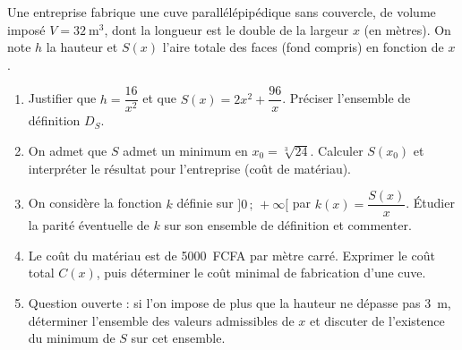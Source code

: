 \documentclass[11pt]{article}
\begin{document}
\begin{exercice}
Une entreprise fabrique une cuve parallélépipédique sans couvercle, de volume imposé $V=\SI{32}{\meter\cubed}$, dont la longueur est le double de la largeur $x$ (en mètres). On note $h$ la hauteur et $S(x)$ l'aire totale des faces (fond compris) en fonction de $x$.
\begin{enumerate}
\item Justifier que $h=\dfrac{16}{x^{2}}$ et que $S(x)=2x^{2}+\dfrac{96}{x}$. Préciser l'ensemble de définition $D_S$.
\item On admet que $S$ admet un minimum en $x_0=\sqrt[3]{24}$. Calculer $S(x_0)$ et interpréter le résultat pour l'entreprise (coût de matériau).
\item On considère la fonction $k$ définie sur $]0\,;\,+\infty[$ par $k(x)=\dfrac{S(x)}{x}$. Étudier la parité éventuelle de $k$ sur son ensemble de définition et commenter.
\item Le coût du matériau est de \SI{5000}{FCFA} par mètre carré. Exprimer le coût total $C(x)$, puis déterminer le coût minimal de fabrication d'une cuve.
\item Question ouverte : si l'on impose de plus que la hauteur ne dépasse pas \SI{3}{\meter}, déterminer l'ensemble des valeurs admissibles de $x$ et discuter de l'existence du minimum de $S$ sur cet ensemble.
\end{enumerate}
\end{exercice}
\end{document}
